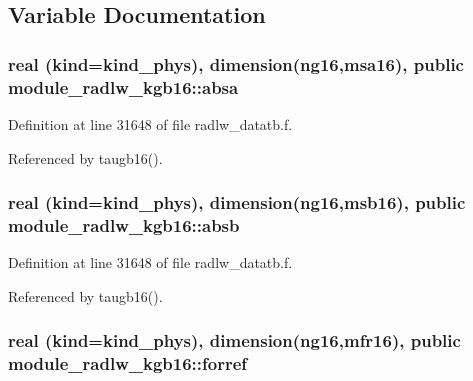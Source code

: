 \subsection{Variable Documentation}
\subsubsection[{\texorpdfstring{absa}{absa}}]{\setlength{\rightskip}{0pt plus 5cm}real (kind=kind\+\_\+phys), dimension(ng16,{\bf msa16}), public module\+\_\+radlw\+\_\+kgb16\+::absa}\hypertarget{namespacemodule__radlw__kgb16_a2734b420b7e8e8393a8bf1b595a3cf09}{}\label{namespacemodule__radlw__kgb16_a2734b420b7e8e8393a8bf1b595a3cf09}


Definition at line 31648 of file radlw\+\_\+datatb.\+f.



Referenced by taugb16().

\subsubsection[{\texorpdfstring{absb}{absb}}]{\setlength{\rightskip}{0pt plus 5cm}real (kind=kind\+\_\+phys), dimension(ng16,{\bf msb16}), public module\+\_\+radlw\+\_\+kgb16\+::absb}\hypertarget{namespacemodule__radlw__kgb16_ae856b42252b71d4d588ea5e19e871cac}{}\label{namespacemodule__radlw__kgb16_ae856b42252b71d4d588ea5e19e871cac}


Definition at line 31648 of file radlw\+\_\+datatb.\+f.



Referenced by taugb16().

\subsubsection[{\texorpdfstring{forref}{forref}}]{\setlength{\rightskip}{0pt plus 5cm}real (kind=kind\+\_\+phys), dimension(ng16,{\bf mfr16}), public module\+\_\+radlw\+\_\+kgb16\+::forref}\hypertarget{namespacemodule__radlw__kgb16_a4402ed68e18459813a6c9ede5d6ba9cc}{}\label{namespacemodule__radlw__kgb16_a4402ed68e18459813a6c9ede5d6ba9cc}


